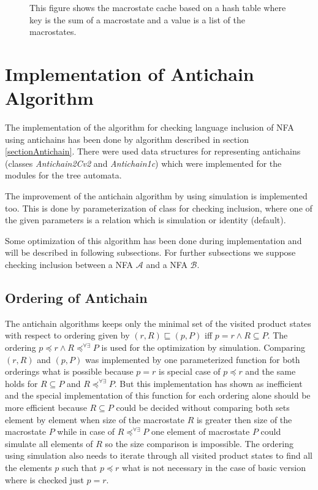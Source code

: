 \begin{figure}[bt]
\begin{center}
  
  \caption{This figure shows the macrostate cache based on a hash table where key is the sum of a macrostate and a value is a list of the macrostates.}
  \label{figMacroCache}
\end{center}
\end{figure}

\section{Implementation of Antichain Algorithm}
The implementation of the algorithm for checking language inclusion of NFA using antichains has been done by algorithm described in section 
\ref{sectionAntichain}.  There were used data structures for representing antichains (classes \emph{Antichain2Cv2} and \emph{Antichain1c}) which
were implemented for the modules for the tree automata. 

The improvement of the antichain algorithm by using simulation is implemented too. 
This is done by parameterization of class for checking inclusion, where one of the given parameters is a relation which is simulation or identity (default).

Some optimization of this algorithm has been done during implementation and will be described in following subsections. For further subsections we suppose
checking inclusion between a NFA $\mathcal{A}$ and a NFA $\mathcal{B}$.

\subsection{Ordering of Antichain}
The antichain algorithms keeps only the minimal set of the visited product states with respect to ordering given by $(r,R)\sqsubseteq (p,P)$
iff $p=r \wedge R \subseteq P$. The ordering $p\preceq r \wedge R\preceq^{\forall\exists}P$ is used for the optimization by simulation.
Comparing $(r,R)$ and $(p,P)$ was implemented by one parameterized function for both orderings what is possible because $p=r$ is special case of $p\preceq r$ 
and the same holds for $R \subseteq P$ and $R\preceq^{\forall\exists}P$. But this implementation has shown as inefficient and the special implementation of
this function for each ordering alone should be more efficient because $R\subseteq P$ could be decided 
without comparing both sets element by element when size of the macrostate $R$ is greater then size of the macrostate $P$ while in case of
$R\preceq^{\forall\exists}P$ one element of macrostate $P$ could simulate all elements of $R$ so the size comparison is impossible.
The ordering using simulation also needs to iterate through all visited product states to find all the elements $p$ such that $p\preceq r$ what 
is not necessary in the case of basic version where is checked just $p=r$.

